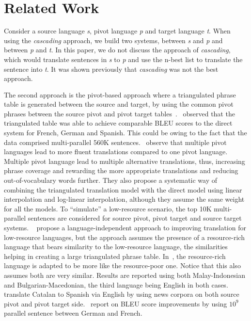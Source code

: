 \documentclass[11pt]{article}
\begin{document}
	

\section{Related Work}
Consider a source language \emph{s}, pivot language \emph{p} and target language \emph{t}. When using the \emph{cascading} approach, we build two systems, between \emph{s} and \emph{p} and between \emph{p} and \emph{t}. In this paper, we do not discuss the approach of \emph{cascading}, which would translate sentences in \emph{s} to \emph{p} and use the n-best list to translate the sentence into \emph{t}. It was shown previously \cite{Utiyama:07,Gispert:06} that \emph{cascading} was not the best approach. 

The second approach is the pivot-based approach where a triangulated phrase table is generated between the source and target, by using the common pivot phrases between the source pivot and pivot target tables~\cite{Utiyama:07,Cohn:07,Wuwang:07}.~\cite{Utiyama:07} observed that the triangulated table was able to achieve comparable BLEU scores to the direct system for French, German and Spanish. This could be owing to the fact that the data comprised multi-parallel 560K sentences.~\cite{Cohn:07} observe that multiple pivot languages lead to more fluent translations compared to one pivot language. Multiple pivot language lead to multiple alternative translations, thus, increasing phrase coverage and rewarding the more appropriate translations and reducing out-of-vocabulary words further. They also propose a systematic way of combining the triangulated translation model with the direct model using linear interpolation and log-linear interpolation, although they assume the same weight for all the models. To ``simulate'' a low-resource scenario, the top 10K multi-parallel sentences are considered for source pivot, pivot target and source target systems. ~\cite{Nakov:12} propose a language-independent approach to improving translation for low-resource languages, but the approach assumes the presence of a resource-rich language that bears similarity to the low-resource language, the similarities helping in creating a large triangulated phrase table. In~\cite{Nakovemnlp:12}, the resource-rich language is adapted to be more like the resource-poor one. Notice that this also assumes both are very similar. Results are reported using both Malay-Indonesian and Bulgarian-Macedonian, the third language being English in both cases.~\cite{Gispert:06} translate Catalan to Spanish via English by using news corpora on both source pivot and pivot target side.~\cite{Huck:12} report on BLEU score improvements by using $10^9$ parallel sentence between German and French.
\end{document}
